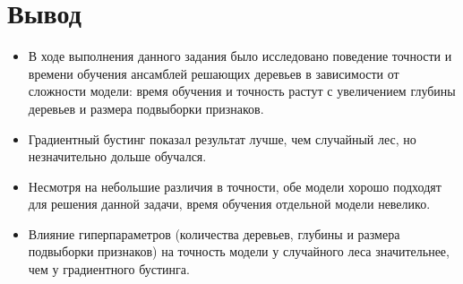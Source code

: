 \documentclass[12pt, a4paper]{article}
\begin{document}
\section{Вывод}
\begin{itemize}
\item В ходе выполнения данного задания было исследовано поведение точности и времени обучения ансамблей решающих деревьев в зависимости от сложности модели: время обучения и точность растут с увеличением глубины деревьев и размера подвыборки признаков.
\item Градиентный бустинг показал результат лучше, чем случайный лес, но незначительно дольше обучался. 
\item Несмотря на небольшие различия в точности, обе модели хорошо подходят для решения данной задачи, время обучения отдельной модели невелико. 
\item Влияние гиперпараметров (количества деревьев, глубины и размера подвыборки признаков) на точность модели у случайного леса значительнее, чем у градиентного бустинга.
\end{itemize}
\end{document}
